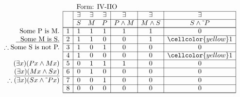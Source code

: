 \documentclass[10pt,legalpaper,landscape,cmtt]{article}
\begin{document}
{\begin{minipage}[t]{3.25in}
	\(
	\begin{array}{r|c|ccc|c|c|c|}
		\multicolumn{2}{c}{}&\multicolumn{6}{l}{\mbox{Form: IV-IIO}} \\ \cline{2-8}
		\hspace{1in}	&	& \exists & \exists & \exists & \exists & \exists & \exists\\ \cline{3-8}
		&	& S & M & P &  P \wedge M  &  M \wedge S  &  S \wedge \tilde~P \\ \cline{2-8} \cline{2-8}
		\phantom{\therefore}\mbox{Some P is M.}   & 1 & 1 & 1 & 1 &   1   &   1   &   0  \\ \cline{2-8}
		\underline{\phantom{\therefore}\mbox{Some M is S.}}   & 2 & 1 & 1 & 0 &   0   &   1   &   \cellcolor{yellow} 1  \\ \cline{2-8}
		\therefore \mbox{Some S is not P.}   & 3 & 1 & 0 & 1 &   0   &   0   &   0  \\ \cline{2-8}
		& 4 & 1 & 0 & 0 &   0   &   0   &   \cellcolor{yellow} 1  \\ \cline{2-8}
		(\exists x)(Px \wedge Mx)   & 5 & 0 & 1 & 1 &   1   &   0   &   0  \\ \cline{2-8}
		\underline{(\exists x)(Mx \wedge Sx)}   & 6 & 0 & 1 & 0 &   0   &   0   &   0  \\ \cline{2-8}
		\therefore(\exists x)(Sx \wedge \tilde~Px)   & 7 & 0 & 0 & 1 &   0   &   0   &   0  \\ \cline{2-8}
		& 8 & 0 & 0 & 0 &   0   &   0   &   0   \\ \cline{2-8}\cline{2-8} 
	\end{array}
	\)
\end{minipage}

\newpage %

}
\end{document}
